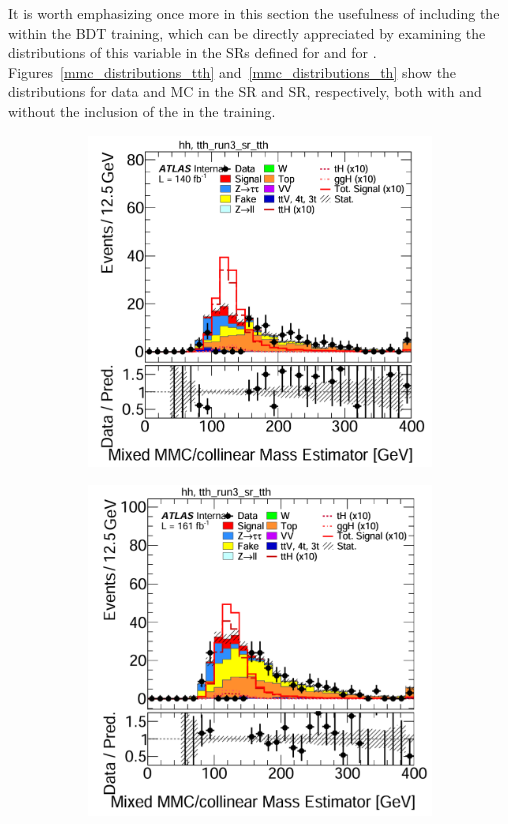 It is worth emphasizing once more in this section the usefulness of including the \mmc within the BDT training, which can be directly appreciated by examining the distributions of this variable in the SRs defined for \ttH and for \thqb. Figures~\ref{mmc_distributions_tth} and~\ref{mmc_distributions_th} show the \mmc distributions for data and MC in the \ttH SR and \thqb SR, respectively, both with and without the inclusion of the \mmc in the training.\begin{figure}[htbp]
  \centering
  \begin{subfigure}[t]{0.45\textwidth}
    \centering
    \includegraphics[width=\linewidth]{images/mmc_th_tth/run_2_wo_mmc_tth.png}
  \end{subfigure}
  \hfill
  \begin{subfigure}[t]{0.45\textwidth}
    \centering
    \includegraphics[width=\linewidth]{images/mmc_th_tth/run_3_wo_mmc_tth.png}

\end{subfigure}
\end{figure}
